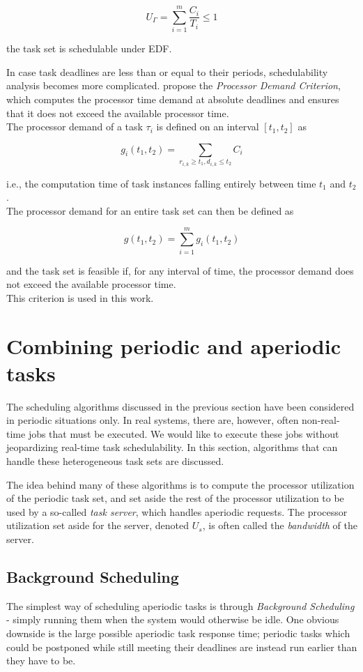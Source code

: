 \documentclass[twoside]{uva-inf-bachelor-thesis}
\begin{document}
\[ U_\Gamma = \sum_{i=1}^m \dfrac{C_i}{T_i} \le 1 \]

\noindent the task set is schedulable under EDF.

In case task deadlines are less than or equal to their periods, schedulability analysis becomes more complicated. \textcite{Baruah1990} propose the \emph{Processor Demand Criterion}, which computes the processor time demand at absolute deadlines and ensures that it does not exceed the available processor time.\\

\noindent The processor demand of a task $\tau_i$ is defined on an interval $[t_1, t_2]$ as

\[ g_i(t_1, t_2) = \sum_{r_{i,k} \ge t_1, d_{i,k} \le t_2} C_i \]

\noindent i.e., the computation time of task instances falling entirely between time $t_1$ and $t_2$.\\

\noindent The processor demand for an entire task set can then be defined as

\[ g(t_1, t_2) = \sum_{i=1}^m g_i(t_1, t_2) \]

\noindent and the task set is feasible if, for any interval of time, the processor demand does not exceed the available processor time.\\

\noindent This criterion is used in this work.

\section{Combining periodic and aperiodic tasks}
The scheduling algorithms discussed in the previous section have been considered in periodic situations only. In real systems, there are, however, often non-real-time jobs that must be executed. We would like to execute these jobs without jeopardizing real-time task schedulability. In this section, algorithms that can handle these heterogeneous task sets are discussed.

The idea behind many of these algorithms is to compute the processor utilization of the periodic task set, and set aside the rest of the processor utilization to be used by a so-called \emph{task server}, which handles aperiodic requests. The processor utilization set aside for the server, denoted $U_s$, is often called the \emph{bandwidth} of the server.

\subsection{Background Scheduling}
The simplest way of scheduling aperiodic tasks is through \emph{Background Scheduling} - simply running them when the system would otherwise be idle. One obvious downside is the large possible aperiodic task response time; periodic tasks which could be postponed while still meeting their deadlines are instead run earlier than they have to be.
\end{document}
